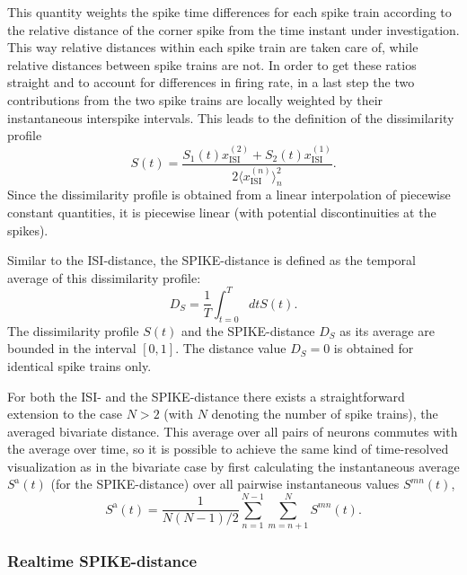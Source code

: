 \documentclass[10pt,twocolumn]{elsart5p}
\begin{document}
This quantity weights the spike time differences for each spike train according to the relative distance of the corner spike from the time instant under investigation. This way relative distances within each spike train are taken care of, while relative distances between spike trains are not. In order to get these ratios straight and to account for differences in firing rate, in a last step the two contributions from the two spike trains are locally weighted by their instantaneous interspike intervals. This leads to the definition of the dissimilarity profile
%
\begin{equation} \label{eq:Bi-Spike-Diss-Improved}
     S (t) = \frac{S_1 (t) x_{\mathrm {ISI}}^{(2)} + S_2 (t) x_{\mathrm {ISI}}^{(1)}}{2 \langle x_{\mathrm {ISI}}^{(n)} \rangle_n^2}.
\end{equation}
%
Since the dissimilarity profile is obtained from a linear interpolation of piecewise constant quantities, it is piecewise linear (with potential discontinuities at the spikes).

Similar to the ISI-distance, the SPIKE-distance is defined as the temporal average of this dissimilarity profile:
%
\begin{equation} \label{eq:Temporal-Average2}
    D_S = \frac{1}{T} \int_{t=0}^T dt S (t).
\end{equation}
%
The dissimilarity profile $S (t)$ and the SPIKE-distance $D_S$ as its average are bounded in the interval $[0, 1]$. The distance value $D_S = 0$ is obtained for identical spike trains only.

	
For both the ISI- and the SPIKE-distance there exists a straightforward extension to the case $N > 2$ (with $N$ denoting the number of spike trains), the averaged bivariate distance. This average over all pairs of neurons commutes with the average over time, so it is possible to achieve the same kind of time-resolved visualization as in the bivariate case by first calculating the instantaneous average $S^{\mathrm {a}} (t)$ (for the SPIKE-distance) over all pairwise instantaneous values $S^{mn} (t)$,
%
\begin{equation} \label{eq:Bivariate-Average}
    S^{\mathrm {a}} (t) = \frac{1}{N(N-1)/2}\sum_{n=1}^{N-1} \sum_{m=n+1}^N S^{mn} (t).
\end{equation}



\subsubsection{\label{sss:Realtime-Spike-Distance} Realtime SPIKE-distance}
\end{document}
